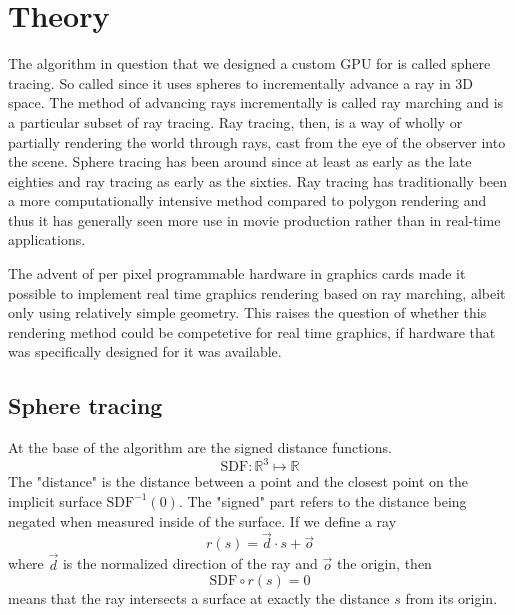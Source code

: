 \chapter{Theory}
	The algorithm in question that we designed a custom GPU for is called
	sphere tracing.\cite{Hart1996} So called since it uses spheres to
	incrementally advance a ray in 3D space. The method of advancing rays
	incrementally is called ray marching and is a particular subset of ray
	tracing.\cite{Whitted1980} Ray tracing, then, is a way of wholly or
	partially rendering the world through rays, cast from the eye of the
	observer into the scene.  Sphere tracing has been around since at least as
	early as the late eighties and ray tracing as early as the
	sixties.\cite{Hart1989,Appel1968} Ray tracing has traditionally been
	a more computationally intensive method compared to polygon rendering\cite{Wylie1967}
	and thus it has generally seen more use in movie production rather than
	in real-time applications.\cite{ref_needed?} 
	
	
	The advent of per pixel programmable hardware in graphics cards made it
	possible to implement real time graphics rendering based on ray marching, 
	albeit only using relatively simple geometry. This raises the question of 
	whether this rendering method could be competetive for real time graphics,
	if hardware that was specifically designed for it was available.
	
		
	\section{Sphere tracing} 
	
		\begin{minipage}{0.6\textwidth} 
		
			At the base of the algorithm are the signed distance functions.
			$$\text{SDF}:\mathbb{R}^{3}\mapsto\mathbb{R}$$ The "distance" is
			the distance between a point and the closest point on the implicit
			surface $\text{SDF}^{-1}(0)$. The "signed" part refers to the
			distance being negated when measured inside of the surface.  If we
			define a ray $$r(s) = \vec{d} \cdot s + \vec{o}$$ where $\vec{d}$
			is the normalized direction of the ray and $\vec{o}$ the origin,
			then $$\text{SDF}\circ r(s) = 0$$ means that the ray intersects a
			surface at exactly the distance $s$ from its origin.
		
		\end{minipage} 
		
